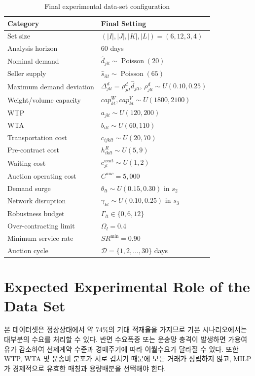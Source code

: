 \documentclass[11pt,a4paper]{article}
\begin{document}
\begin{table}[h!]
\centering
\begin{tabularx}{0.92\textwidth}{lY}
\toprule
\textbf{Category} & \textbf{Final Setting} \\
\midrule
Set size & $(|I|,|J|,|K|,|L|)=(6,12,3,4)$ \\
Analysis horizon & 60 days \\
Nominal demand & $\hat d_{jlt}\sim\operatorname{Poisson}(20)$ \\
Seller supply & $\hat s_{ilt}\sim\operatorname{Poisson}(65)$ \\
Maximum demand deviation & $\Delta^d_{jlt}=\rho^d_{jlt}\hat d_{jlt}$, $\rho^d_{jlt}\sim U(0.10,0.25)$ \\
Weight/volume capacity & $cap^W_{kt},cap^V_{kt}\sim U(1800,2100)$ \\
WTP & $a_{jlt}\sim U(120,200)$ \\
WTA & $b_{ilt}\sim U(60,110)$ \\
Transportation cost & $c_{ijklt}\sim U(20,70)$ \\
Pre-contract cost & $h^R_{iklt}\sim U(5,9)$ \\
Waiting cost & $c^{wait}_{jl}\sim U(1,2)$ \\
Auction operating cost & $C^{auc}=5{,}000$ \\
Demand surge & $\theta_{lt}\sim U(0.15,0.30)$ in $s_2$ \\
Network disruption & $\gamma_{kt}\sim U(0.10,0.25)$ in $s_3$ \\
Robustness budget & $\Gamma_{lt}\in\{0,6,12\}$ \\
Over-contracting limit & $\Omega_l=0.4$ \\
Minimum service rate & $SR^{\min}=0.90$ \\
Auction cycle & $\mathcal D=\{1,2,\ldots,30\}$ days \\
\bottomrule
\end{tabularx}
\caption{Final experimental data-set configuration}
\end{table}

\section{Expected Experimental Role of the Data Set}
본 데이터셋은 정상상태에서 약 74\%의 기대 적재율을 가지므로 기본 시나리오에서는 대부분의 수요를 처리할 수 있다. 반면 수요폭증 또는 운송망 충격이 발생하면 가용여유가 감소하여 선제계약 수준과 경매주기에 따라 이월수요가 달라질 수 있다. 또한 WTP, WTA 및 운송비 분포가 서로 겹치기 때문에 모든 거래가 성립하지 않고, MILP가 경제적으로 유효한 매칭과 용량배분을 선택해야 한다.
\end{document}

